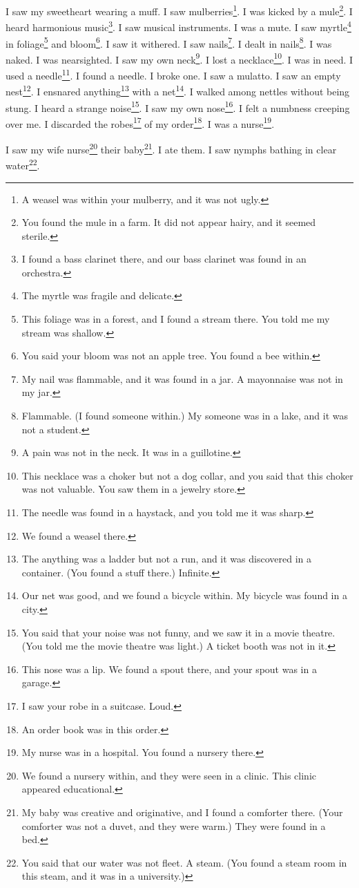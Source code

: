 \documentclass[12pt]{book}
\begin{document}
 I saw my sweetheart wearing a muff. I saw mulberries\footnote{A weasel was within your mulberry, and it was not ugly.}. I was kicked by a mule\footnote{You found the mule in a farm. It did not appear hairy, and it seemed sterile.}. I heard harmonious music\footnote{I found a bass clarinet there, and our bass clarinet was found in an orchestra.}. I saw musical instruments. I was a mute. I saw myrtle\footnote{The myrtle was fragile and delicate.} in foliage\footnote{This foliage was in a forest, and I found a stream there. You told me my stream was shallow.} and bloom\footnote{You said your bloom was not an apple tree. You found a bee within.}. I saw it withered. I saw nails\footnote{My nail was flammable, and it was found in a jar. A mayonnaise was not in my jar.}. I dealt in nails\footnote{Flammable. (I found someone within.) My someone was in a lake, and it was not a student.}. I was naked. I was nearsighted. I saw my own neck\footnote{A pain was not in the neck. It was in a guillotine.}. I lost a necklace\footnote{This necklace was a choker but not a dog collar, and you said that this choker was not valuable. You saw them in a jewelry store.}. I was in need. I used a needle\footnote{The needle was found in a haystack, and you told me it was sharp.}. I found a needle. I broke one. I saw a mulatto. I saw an empty nest\footnote{We found a weasel there.}. I ensnared anything\footnote{The anything was a ladder but not a run, and it was discovered in a container. (You found a stuff there.) Infinite.} with a net\footnote{Our net was good, and we found a bicycle within. My bicycle was found in a city.}. I walked among nettles without being stung. I heard a strange noise\footnote{You said that your noise was not funny, and we saw it in a movie theatre. (You told me the movie theatre was light.) A ticket booth was not in it.}. I saw my own nose\footnote{This nose was a lip. We found a spout there, and your spout was in a garage.}. I felt a numbness creeping over me. I discarded the robes\footnote{I saw your robe in a suitcase. Loud.} of my order\footnote{An order book was in this order.}. I was a nurse\footnote{My nurse was in a hospital. You found a nursery there.}. 

 I saw my wife nurse\footnote{We found a nursery within, and they were seen in a clinic. This clinic appeared educational.} their baby\footnote{My baby was creative and originative, and I found a comforter there. (Your comforter was not a duvet, and they were warm.) They were found in a bed.}. I ate them. I saw nymphs bathing in clear water\footnote{You said that our water was not fleet. A steam. (You found a steam room in this steam, and it was in a university.)}. 
\end{document}
